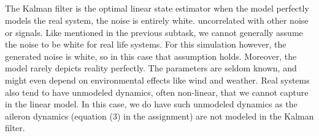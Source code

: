



\subsection{} %
The Kalman filter is the optimal linear state estimator when the model perfectly models the real system, the noise is entirely white. uncorrelated with other noise or signals. Like mentioned in the previous subtask, we cannot generally assume the noise to be white for real life systems. For this simulation however, the generated noise is white, so in this case that assumption holds. Moreover, the model rarely depicts reality perfectly. The parameters are seldom known, and might even depend on environmental effects like wind and weather. Real systems also tend to have unmodeled dynamics, often non-linear, that we cannot capture in the linear model. In this case, we do have such unmodeled dynamics as the aileron dynamics (equation (3) in the assignment) are not modeled in the Kalman filter.

\subsection{} %


